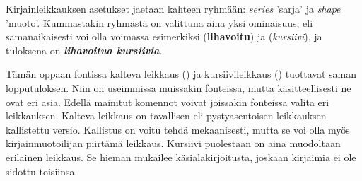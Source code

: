 
Kirjainleikkauksen asetukset jaetaan kahteen ryhmään:
\textenglish{\emph{series}} 'sarja' ja \textenglish{\emph{shape}}
'muoto'. Kummastakin ryhmästä on valittuna aina yksi ominaisuus, eli
samanaikaisesti voi olla voimassa esimerkiksi 
(\textbf{lihavoitu}) ja  (\textit{kursiivi}), ja
tuloksena on \textbf{\itshape lihavoitua kursiivia}.

Tämän oppaan fontissa kalteva leikkaus () ja
kursiivileikkaus () tuottavat saman lopputuloksen.
Niin on useimmissa muissakin fonteissa, mutta käsitteellisesti ne ovat
eri asia. Edellä mainitut komennot voivat joissakin fonteissa valita eri
leikkauksen. Kalteva leikkaus on tavallisen eli pys\-ty\-asen\-toi\-sen
leikkauksen kallistettu versio. Kallistus on voitu tehdä mekaanisesti,
mutta se voi olla myös kirjainmuotoilijan piirtämä leikkaus. Kursiivi
puolestaan on aina muodoltaan erilainen leikkaus. Se hieman mukailee
käsi\-ala\-kir\-joi\-tusta, joskaan kirjaimia ei ole sidottu toisiinsa.

